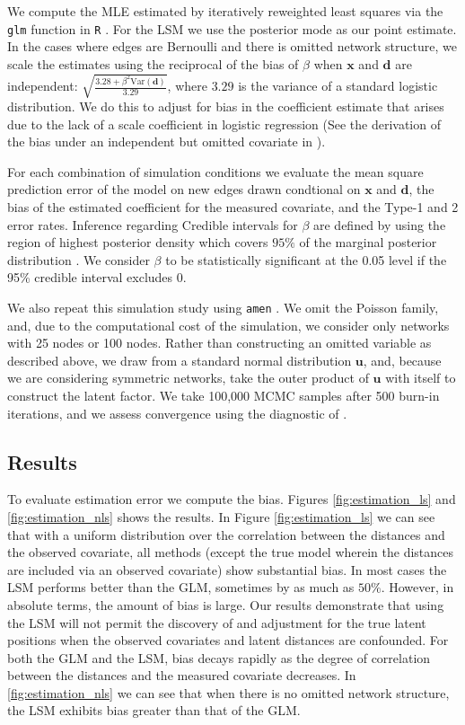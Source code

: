 \documentclass[11pt]{article}
\begin{document}
We compute the MLE estimated by iteratively reweighted least squares
via the \texttt{glm} function in \texttt{R} \citep{rcore}. For the LSM
we use the posterior mode as our point estimate. In the cases where
edges are Bernoulli and there is omitted network structure, we scale
the estimates using the reciprocal of the bias of $\beta$ when
$\mathbf{x}$ and $\mathbf{d}$ are independent: $\sqrt{\frac{3.28 +
    \beta^2 \text{Var}(\mathbf{d})}{3.29}}$, where $3.29$ is the
variance of a standard logistic distribution. We do this to adjust for
bias in the coefficient estimate that arises due to the lack of a
scale coefficient in logistic regression (See the derivation of the
bias under an independent but omitted covariate in
\cite{mood2010logistic}).

For each combination of simulation conditions we evaluate the mean
square prediction error of the model on new edges drawn condtional on
$\mathbf{x}$ and $\mathbf{d}$, the bias of the estimated coefficient
for the measured covariate, and the Type-1 and 2 error
rates. Inference regarding Credible intervals for $\beta$ are defined
by using the region of highest posterior density which covers $95\%$
of the marginal posterior distribution
\cite{turkkan1993computation}. We consider $\beta$ to be statistically
significant at the 0.05 level if the 95\% credible interval excludes
0.

We also repeat this simulation study using \texttt{amen}
\citep{hoff2015dyadic, minhas2016inferential}. We omit the Poisson
family, and, due to the computational cost of the simulation, we
consider only networks with 25 nodes or 100 nodes. Rather than
constructing an omitted variable as described above, we draw from a
standard normal distribution $\mathbf{u}$, and, because we are
considering symmetric networks, take the outer product of $\mathbf{u}$
with itself to construct the latent factor. We take 100,000 MCMC
samples after 500 burn-in iterations, and we assess convergence using
the diagnostic of \cite{raftery1992practical}.

\subsection{Results}

To evaluate estimation error we compute the bias. Figures
\ref{fig:estimation_ls} and \ref{fig:estimation_nls} shows the
results. In Figure \ref{fig:estimation_ls} we can see that with a
uniform distribution over the correlation between the distances and
the observed covariate, all methods (except the true model wherein the
distances are included via an observed covariate) show substantial
bias. In most cases the LSM performs better than the GLM, sometimes by
as much as $50\%$. However, in absolute terms, the amount of bias is
large. Our results demonstrate that using the LSM will not permit the
discovery of and adjustment for the true latent positions when the
observed covariates and latent distances are confounded.  For both the
GLM and the LSM, bias decays rapidly as the degree of correlation
between the distances and the measured covariate decreases. In
\ref{fig:estimation_nls} we can see that when there is no omitted
network structure, the LSM exhibits bias greater than that of the GLM.
\end{document}
